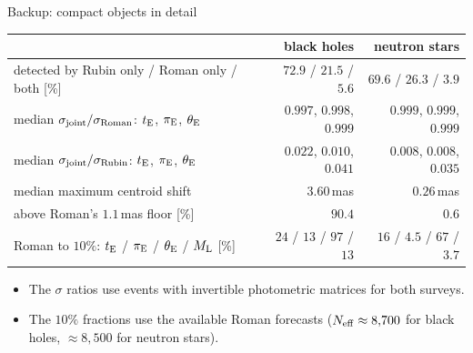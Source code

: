 \begin{frame}{Backup: compact objects in detail}
\centering
\small
\renewcommand{\arraystretch}{1.15}
\begin{tabular}{lrr}
\toprule
 & black holes & neutron stars \\
\midrule
detected by Rubin only / Roman only / both [\%] & $72.9$ / $21.5$ / $5.6$ & $69.6$ / $26.3$ / $3.9$ \\
median $\sigma_{\rm joint}/\sigma_{\rm Roman}$: $t_{\rm E}$, $\pi_{\rm E}$, $\theta_{\rm E}$ & $0.997$, $0.998$, $0.999$ & $0.999$, $0.999$, $0.999$ \\
median $\sigma_{\rm joint}/\sigma_{\rm Rubin}$: $t_{\rm E}$, $\pi_{\rm E}$, $\theta_{\rm E}$ & $0.022$, $0.010$, $0.041$ & $0.008$, $0.008$, $0.035$ \\
median maximum centroid shift & $3.60$\,mas & $0.26$\,mas \\
above Roman's $1.1$\,mas floor [\%] & $90.4$ & $0.6$ \\
Roman to $10\%$: $t_{\rm E}$ / $\pi_{\rm E}$ / $\theta_{\rm E}$ / $M_{\rm L}$ [\%] & $24$ / $13$ / $97$ / $13$ & $16$ / $4.5$ / $67$ / $3.7$ \\
\bottomrule
\end{tabular}

\vspace{4mm}
\begin{itemize}\small
  \item The $\sigma$ ratios use events with invertible photometric matrices for both surveys.
  \item The $10\%$ fractions use the available Roman forecasts ($N_{\rm eff}\approx8{,}700$ for black holes,
        $\approx8{,}500$ for neutron stars).
\end{itemize}
\vfill
{}
\end{frame}

